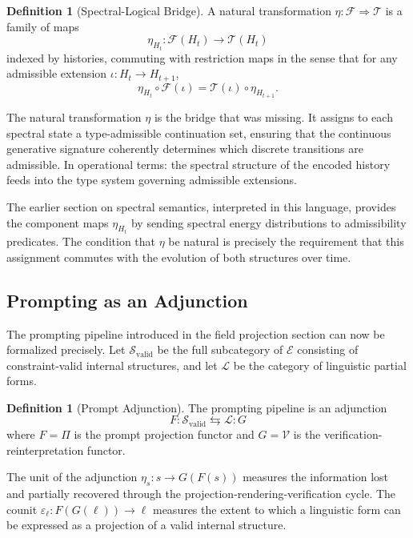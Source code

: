 \documentclass[12pt, a4paper]{article}
\theoremstyle{plain}
\theoremstyle{definition}
\newtheorem{definition}[theorem]{Definition}
\theoremstyle{remark}
\begin{document}
\begin{definition}[Spectral-Logical Bridge]
A natural transformation $\eta : \mathcal{F} \Rightarrow \mathcal{T}$ is a family of maps
\[
\eta_{H_t} : \mathcal{F}(H_t) \to \mathcal{T}(H_t)
\]
indexed by histories, commuting with restriction maps in the sense that for any admissible extension $\iota : H_t \to H_{t+1}$,
\[
\eta_{H_t} \circ \mathcal{F}(\iota) = \mathcal{T}(\iota) \circ \eta_{H_{t+1}}.
\]
\end{definition}

The natural transformation $\eta$ is the bridge that was missing. It assigns to each spectral state a type-admissible continuation set, ensuring that the continuous generative signature coherently determines which discrete transitions are admissible. In operational terms: the spectral structure of the encoded history feeds into the type system governing admissible extensions.

The earlier section on spectral semantics, interpreted in this language, provides the component maps $\eta_{H_t}$ by sending spectral energy distributions to admissibility predicates. The condition that $\eta$ be natural is precisely the requirement that this assignment commutes with the evolution of both structures over time.

\subsection{Prompting as an Adjunction}

The prompting pipeline introduced in the field projection section can now be formalized precisely. Let $\mathcal{S}_{\mathrm{valid}}$ be the full subcategory of $\mathcal{E}$ consisting of constraint-valid internal structures, and let $\mathcal{L}$ be the category of linguistic partial forms.

\begin{definition}[Prompt Adjunction]
The prompting pipeline is an adjunction
\[
F : \mathcal{S}_{\mathrm{valid}} \leftrightarrows \mathcal{L} : G
\]
where $F = \Pi$ is the prompt projection functor and $G = \mathcal{V}$ is the verification-reinterpretation functor.
\end{definition}

The unit of the adjunction $\eta_s : s \to G(F(s))$ measures the information lost and partially recovered through the projection-rendering-verification cycle. The counit $\varepsilon_\ell : F(G(\ell)) \to \ell$ measures the extent to which a linguistic form can be expressed as a projection of a valid internal structure.
\end{document}
